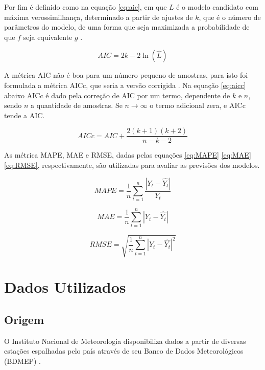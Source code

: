 Por fim é definido como na equação \ref{eq:aic}, em que $L$ é o modelo candidato com máxima verossimilhança, determinado a partir de ajustes de $k$, que é o número de parâmetros do modelo, de uma forma que seja maximizada a probabilidade de que $f$ seja equivalente $g$ \cite{wagenmakers2004aic}.

\begin{equation}
\label{eq:aic}
    AIC = 2k - 2\ln(\hat L)
\end{equation}

A métrica AIC não é boa para um número pequeno de amostras, para isto foi formulada a métrica AICc, que seria a versão corrigida \cite{hurvich1989regression}. Na equação \ref{eq:aicc} abaixo AICc é dado pela correção de AIC por um termo, dependente de $k$ e $n$, sendo $n$ a quantidade de amostras. Se $n \to \infty$ o termo adicional zera, e AICc tende a AIC. 

\begin{equation}
\label{eq:aicc}
    AICc = AIC + \frac{2(k+1)(k+2)}{n - k -2}
\end{equation}

As métrica MAPE, MAE e RMSE, dadas pelas equações \ref{eq:MAPE} \ref{eq:MAE} \ref{eq:RMSE}, respectivamente, são utilizadas para avaliar as previsões dos modelos. 

\begin{equation}
\label{eq:MAPE}
    MAPE = \frac{1}{n}\sum_{t=1}^{n} \frac{|Y_t - \hat{Y_t}|}{Y_t}
\end{equation}

\begin{equation}
\label{eq:MAE}
    MAE = \frac{1}{n}\sum_{t=1}^{n} |Y_t - \hat{Y_t}|
\end{equation}

\begin{equation}
\label{eq:RMSE}
    RMSE = \sqrt{\frac{1}{n}\sum_{t=1}^{n} |Y_t - \hat{Y_t}|^2}
\end{equation}

\section{Dados Utilizados} 
\label{cap:dados_prep}

\subsection{Origem}
\label{subsec:orig_data}

O Instituto Nacional de Meteorologia disponibiliza dados a partir de diversas estações espalhadas pelo país através de seu Banco de Dados Meteorológicos (BDMEP) \cite{INMET}.

